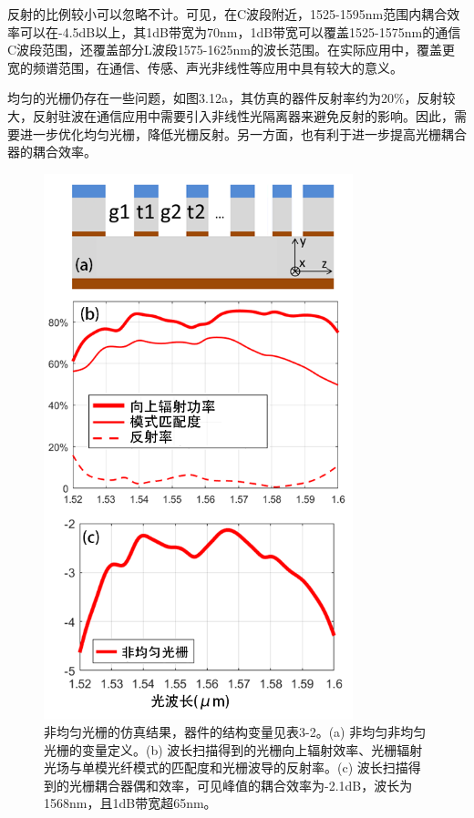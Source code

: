 反射的比例较小可以忽略不计。可见，在C波段附近，1525-1595nm范围内耦合效率可以在-4.5dB以上，其1dB带宽为70nm，1dB带宽可以覆盖1525-1575nm的通信C波段范围，还覆盖部分L波段1575-1625nm的波长范围。在实际应用中，覆盖更宽的频谱范围，在通信、传感、声光非线性等应用中具有较大的意义。
 
均匀的光栅仍存在一些问题，如图3.12a，其仿真的器件反射率约为20\%，反射较大，反射驻波在通信应用中需要引入非线性光隔离器来避免反射的影响。因此，需要进一步优化均匀光栅，降低光栅反射。另一方面，也有利于进一步提高光栅耦合器的耦合效率。

\begin{figure}[!htbp]
    \centering
    \includegraphics[width=0.8\textwidth]{Img/3-13.png}
    \caption{ 非均匀光栅的仿真结果，器件的结构变量见表3-2。(a) 非均匀非均匀光栅的变量定义。(b) 波长扫描得到的光栅向上辐射效率、光栅辐射光场与单模光纤模式的匹配度和光栅波导的反射率。(c) 波长扫描得到的光栅耦合器偶和效率，可见峰值的耦合效率为-2.1dB，波长为1568nm，且1dB带宽超65nm。}
    \label{fig:3-13}
\end{figure}

